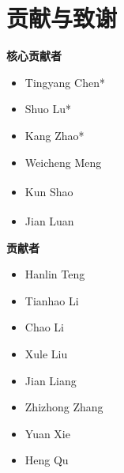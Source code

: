 \section*{贡献与致谢}
\label{sec:contributions}

\vspace{4pt}
\noindent
\begin{minipage}[t]{0.45\textwidth}
\textbf{\textsf{\textcolor{hxBlue}{核心贡献者}}}
\begin{itemize}[leftmargin=12pt,itemsep=1pt,parsep=0pt,topsep=4pt]
  \item Tingyang Chen*
  \item Shuo Lu*
  \item Kang Zhao*
  \item Weicheng Meng
  \item Kun Shao\textsuperscript{\dag}
  \item Jian Luan\textsuperscript{\dag}
\end{itemize}
\end{minipage}%
\hfill
\begin{minipage}[t]{0.45\textwidth}
\textbf{\textsf{\textcolor{hxBlue}{贡献者}}}
\begin{itemize}[leftmargin=12pt,itemsep=1pt,parsep=0pt,topsep=4pt]
  \item Hanlin Teng
  \item Tianhao Li
  \item Chao Li
  \item Xule Liu
  \item Jian Liang
  \item Zhizhong Zhang
  \item Yuan Xie
  \item Heng Qu
\end{itemize}
\end{minipage}

\let\thefootnote\relax{}
